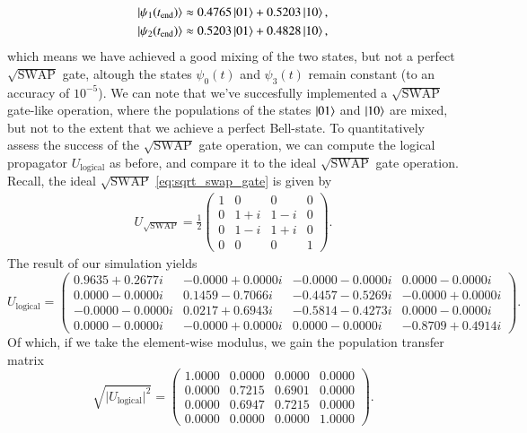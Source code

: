 \documentclass{subfiles}
\begin{document}
\begin{align*}
    \ket{\psi_1(t_{\text{end}})} &\approx 0.4765 \ket{01} + 0.5203 \ket{10}, \\
    \ket{\psi_2(t_{\text{end}})} &\approx 0.5203 \ket{01} + 0.4828 \ket{10},
\end{align*}
which means we have achieved a good mixing of the two states, but not a perfect $\sqrt{\text{SWAP}}$ gate, altough the states $\psi_0(t)$ and $\psi_3(t)$ remain constant (to an accuracy of $10^{-5}$). We can note that we've succesfully implemented a $\sqrt{\text{SWAP}}$ gate-like operation, where the populations of the states $\ket{01}$ and $\ket{10}$ are mixed, but not to the extent that we achieve a perfect Bell-state. 
To quantitatively assess the success of the $\sqrt{\text{SWAP}}$ gate operation, we can compute the logical propagator $U_{\text{logical}}$ as before, and compare it to the ideal $\sqrt{\text{SWAP}}$ gate operation. Recall, the ideal $\sqrt{\text{SWAP}}$ \ref{eq:sqrt_swap_gate} is given by 
\begin{align*}
    U_{\sqrt{\text{SWAP}}} = \frac{1}{{2}}\begin{pmatrix}
        1 & 0 & 0 & 0 \\
        0 & 1 + i & 1 - i & 0 \\
        0 & 1 - i & 1 + i & 0 \\
        0 & 0 & 0 & 1
    \end{pmatrix}.
\end{align*}
The result of our simulation yields
\begin{equation}
U_{\mathrm{logical}}
=\begin{pmatrix}
 0.9635 + 0.2677i & -0.0000 + 0.0000i & -0.0000 - 0.0000i &  0.0000 - 0.0000i\\
 0.0000 - 0.0000i &  0.1459 - 0.7066i & -0.4457 - 0.5269i & -0.0000 + 0.0000i\\
-0.0000 - 0.0000i &  0.0217 + 0.6943i & -0.5814 - 0.4273i &  0.0000 - 0.0000i\\
 0.0000 - 0.0000i & -0.0000 + 0.0000i &  0.0000 - 0.0000i & -0.8709 + 0.4914i
\end{pmatrix}.
\end{equation}
Of which, if we take the element-wise modulus, we gain the population transfer matrix
\begin{equation}
\sqrt{\lvert U_{\mathrm{logical}}\rvert^2}
=\begin{pmatrix}
1.0000 & 0.0000 & 0.0000 & 0.0000\\
0.0000 & 0.7215 & 0.6901 & 0.0000\\
0.0000 & 0.6947 & 0.7215 & 0.0000\\
0.0000 & 0.0000 & 0.0000 & 1.0000
\end{pmatrix}.
\end{equation}
\end{document}
